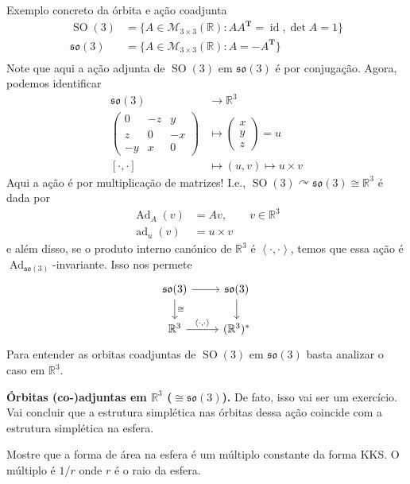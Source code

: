 \begin{idea3}{Exemplo concreto da órbita e ação coadjunta}\leavevmode
	\begin{align*}
		\operatorname{SO}(3)&=\{A\in \mathcal{M}_{3\times 3}(\mathbb{R}):AA^{\mathbf{T}}=\operatorname{id},\det A=1\} \\
		\mathfrak{so}(3) &=\{A\in\mathcal{M}_{3\times 3}(\mathbb{R}):A=-A^{\mathbf{T}}\}\\
	\end{align*}
	Note que aqui a ação adjunta de $\operatorname{SO}(3)$ em $\mathfrak{so}(3)$ é por conjugação. Agora, podemos identificar
	\begin{align*}
		 \mathfrak{so}(3) &\longrightarrow \mathbb{R}^{3} \\
		\begin{pmatrix} 0&-z&y\\z&0&-x\\-y&x&0 \end{pmatrix}  &\longmapsto \begin{pmatrix} x\\y\\z \end{pmatrix} =u\\
		[\cdot,\cdot ]& \longmapsto (u,v)\mapsto u\times v
	\end{align*}
Aqui a ação é por multiplicação de matrizes! I.e., $\operatorname{SO}(3) \curvearrowright \mathfrak{so}(3) \cong \mathbb{R}^{3}$ é dada por
\begin{align*}
	\operatorname{Ad}_A(v)&=Av,\qquad v\in\mathbb{R}^{3}\\
	\operatorname{ad}_u(v)&=u\times v
\end{align*}
e além disso, se o produto interno canónico de $\mathbb{R}^{3}$ é $\left<\cdot,\cdot\right> $, temos que essa ação é $\operatorname{Ad}_{\mathfrak{so}(3)}$-invariante. Isso nos permete 
\[\begin{tikzcd}
	\mathfrak{so}(3)\arrow[r]\arrow[d,"\cong "]&\mathfrak{so}(3)\arrow[d]\\
	\mathbb{R}^{3}\arrow[r,"\left<\cdot\text{,} \cdot\right>" ]&(\mathbb{R}^{3})^*
\end{tikzcd}\]
	Para entender as orbitas coadjuntas de $\operatorname{SO}(3)$ em $\mathfrak{so}(3)$ basta analizar o caso em $\mathbb{R}^{3}$.

	{\color{5}\bfseries \'Orbitas (co-)adjuntas em $\mathbb{R}^{3}$ ($\cong \mathfrak{so}(3)$).}\hspace{.5em} De fato, isso vai ser um exercício. Vai concluir que a estrutura simplética nas órbitas dessa ação coincide com a estrutura simplética na esfera.

	\begin{exercise}\leavevmode
		Mostre que a forma de área na esfera é um múltiplo constante da forma  KKS. O múltiplo é $1/r$ onde  $r$ é o raio da esfera.
	\end{exercise}
\end{idea3}

